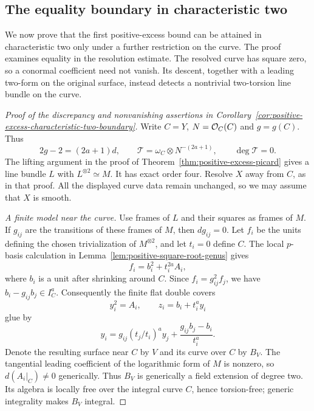 \subsection{The equality boundary in characteristic two}
\label{subsec:positive-excess-boundary}

We now prove that the first positive-excess bound can be attained
in characteristic two only under a further restriction on the curve.
The proof examines equality in the resolution estimate. The resolved
curve has square zero, so a conormal coefficient need not vanish.
Its descent, together with a leading two-form on the original
surface, instead detects a nontrivial two-torsion line bundle on
the curve.

\begin{proof}[Proof of the discrepancy and nonvanishing assertions in Corollary~\ref{cor:positive-excess-characteristic-two-boundary}]
Write $C=Y$, $N=\mathcal O_C(C)$ and $g=g(C)$. Thus
\[
 2g-2=(2a+1)d,\qquad
 \mathcal T=\omega_C\otimes N^{-(2a+1)},\qquad
 \deg\mathcal T=0.
\]
The lifting argument in the proof of
Theorem~\ref{thm:positive-excess-picard} gives a line bundle $L$
with $L^{\otimes2}\simeq M$. It has exact order four.
Resolve $X$ away from $C$, as in that proof. All the displayed
curve data remain unchanged, so we may assume that $X$ is smooth.

\smallskip\noindent
\emph{A finite model near the curve.}
Use frames of $L$ and their squares as frames of $M$. If $g_{ij}$
are the transitions of these frames of $M$, then $dg_{ij}=0$.
Let $f_i$ be the units defining the chosen trivialization of
$M^{\otimes2}$, and let $t_i=0$ define $C$. The local
$p$-basis calculation in
Lemma~\ref{lem:positive-square-root-genus} gives
\begin{equation}\label{eq:boundary-square-approximation}
 f_i=b_i^2+t_i^{2a}A_i,
\end{equation}
where $b_i$ is a unit after shrinking around $C$.
Since $f_i=g_{ij}^2f_j$, we have
$b_i-g_{ij}b_j\in I_C^a$.
Consequently the finite flat double covers
\[
 y_i^2=A_i,\qquad z_i=b_i+t_i^ay_i
\]
glue by
\[
 y_i=g_{ij}(t_j/t_i)^a y_j+
       \frac{g_{ij}b_j-b_i}{t_i^a}.
\]
Denote the resulting surface near $C$ by $V$ and its curve over $C$
by $B_V$. The tangential leading coefficient of the logarithmic
form of $M$ is nonzero, so $d(A_i|_C)\ne0$ generically.
Thus $B_V$ is generically a field extension of degree two.
Its algebra is locally free over the integral curve $C$, hence
torsion-free; generic integrality makes $B_V$ integral.


\end{proof}
